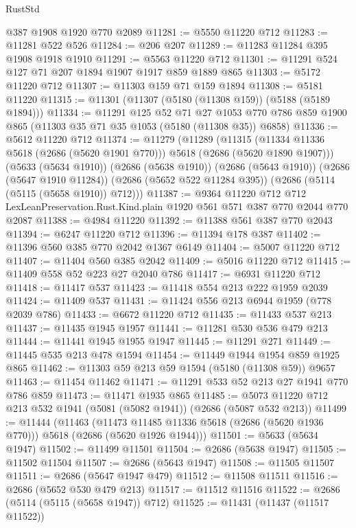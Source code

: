 \begin{lexlean}{RustStd}
\begin{coremodule}
    @387
    @1908
    @1920
    @770
    @2089
@11281 := @5550 @11220 @712
@11283 := @11281 @522 @526
@11284 := @206 @207
@11289 := @11283 @11284 @395 @1908 @1918 @1910
@11291 := @5563 @11220 @712
@11301 := @11291 @524 @127 @71 @207 @1894 @1907 @1917 @859 @1889 @865
@11303 := @5172 @11220 @712
@11307 := @11303 @159 @71 @159 @1894
@11308 := @5181 @11220
@11315 := @11301 (@11307 (@5180 (@11308 @159)) (@5188 (@5189 @1894)))
@11334 := @11291
    @125
    @52
    @71
    @27
    @1053
    @770
    @786
    @859
    @1900
    @865
    (@11303 @35 @71 @35 @1053 (@5180 (@11308 @35)) @6858)
@11336 := @5612 @11220 @712
@11374 := @11279
    (@11289
      (@11315 (@11334 @11336 @5618 (@2686 (@5620 @1901 @770))) @5618 (@2686 (@5620 @1890 @1907)))
      (@5633 (@5634 @1910))
      (@2686 (@5638 @1910))
      (@2686 (@5643 @1910))
      (@2686 (@5647 @1910 @11284))
      (@2686 (@5652 @522 @11284 @395))
      (@2686 (@5114 (@5115 (@5658 @1910)) @712)))
@11387 := @9364
    @11220
    @712
    @712
    LexLeanPreservation.Rust.Kind.plain
    @1920
    @561
    @571
    @387
    @770
    @2044
    @770
    @2087
@11388 := @4984 @11220
@11392 := @11388 @561 @387 @770 @2043
@11394 := @6247 @11220 @712
@11396 := @11394 @178 @387
@11402 := @11396 @560 @385 @770 @2042 @1367 @6149
@11404 := @5007 @11220 @712
@11407 := @11404 @560 @385 @2042
@11409 := @5016 @11220 @712
@11415 := @11409 @558 @52 @223 @27 @2040 @786
@11417 := @6931 @11220 @712
@11418 := @11417 @537
@11423 := @11418 @554 @213 @222 @1959 @2039
@11424 := @11409 @537
@11431 := @11424 @556 @213 @6944 @1959 (@778 @2039 @786)
@11433 := @6672 @11220 @712
@11435 := @11433 @537 @213
@11437 := @11435 @1945 @1957
@11441 := @11281 @530 @536 @479 @213
@11444 := @11441 @1945 @1955 @1947
@11445 := @11291 @271
@11449 := @11445 @535 @213 @478 @1594
@11454 := @11449 @1944 @1954 @859 @1925 @865
@11462 := @11303 @59 @213 @59 @1594 (@5180 (@11308 @59)) @9657
@11463 := @11454 @11462
@11471 := @11291 @533 @52 @213 @27 @1941 @770 @786 @859
@11473 := @11471 @1935 @865
@11485 := @5073 @11220 @712 @213 @532 @1941 (@5081 (@5082 @1941)) (@2686 (@5087 @532 @213))
@11499 := @11444
    (@11463
      (@11473 @11485 @11336 @5618 (@2686 (@5620 @1936 @770)))
      @5618
      (@2686 (@5620 @1926 @1944)))
@11501 := @5633 (@5634 @1947)
@11502 := @11499 @11501
@11504 := @2686 (@5638 @1947)
@11505 := @11502 @11504
@11507 := @2686 (@5643 @1947)
@11508 := @11505 @11507
@11511 := @2686 (@5647 @1947 @479)
@11512 := @11508 @11511
@11516 := @2686 (@5652 @530 @479 @213)
@11517 := @11512 @11516
@11522 := @2686 (@5114 (@5115 (@5658 @1947)) @712)
@11525 := @11431 (@11437 (@11517 @11522))

\end{coremodule}
\end{lexlean}
